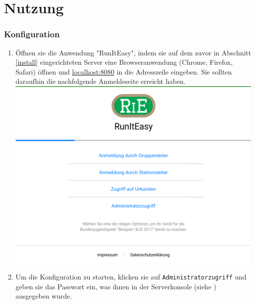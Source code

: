 \documentclass[11pt,a4paper,titlepage,german]{article}
\begin{document}
	\newpage
		
	\part{Nutzung}
		\section{Konfiguration}
			\begin{enumerate}
				\item Öffnen sie die Anwendung "RunItEasy", indem sie auf dem zuvor in Abschnitt \ref{install} eingerichteten Server eine Browseranwendung (Chrome, Firefox, Safari) öffnen und \href{http://localhost:8080/}{\underline{\color{blue}localhost:8080}} in die Adresszeile eingeben. Sie sollten daraufhin die nachfolgende Anmeldeseite erreicht haben.\\
				\includegraphics[width=\textwidth]{Login}
				
				\item Um die Konfiguration zu starten, klicken sie auf \texttt{Administratorzugriff} und geben sie das Passwort ein, was ihnen in der Serverkonsole (siehe ) ausgegeben wurde.
				

\end{enumerate}
\end{document}
